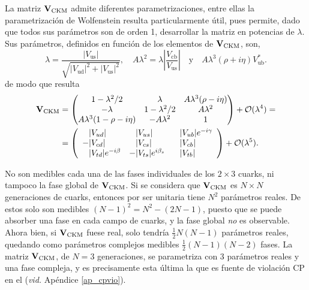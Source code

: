 \color{vero}
La matriz $\mathbf{V}_{\text{CKM}}$ admite diferentes parametrizaciones, entre ellas la parametrización de Wolfenstein resulta particularmente útil, pues permite, dado que todos sus parámetros son de orden 1, desarrollar la matriz en potencias de $\lambda$. Sus parámetros, definidos en función de los elementos de $\mathbf{V}_{\text{CKM}}$, son,
\[ \lambda = \frac{|V_{\text{us}}|}{\sqrt{|V_{\text{ud}}|^2+|V_{\text{us}}|^2}}, \quad A \lambda^2 = \lambda \left|\frac{V_{\text{cb}}}{V_{\text{us}}}\right|\quad \text{y} \quad A \lambda^3 (\rho + i \eta ) V_{\text{ub}}^* . \] \color{norm}
de modo que resulta
\begin{equation}
\begin{split}
\mathbf{V}_{\text{CKM}}   & = \begin{pmatrix} 1-\lambda^2/2 & \lambda & A\lambda^3(\rho-i\eta) \\
 -\lambda & 1-\lambda^2/2 & A\lambda^2 \\
 A\lambda^3(1-\rho-i\eta) & -A\lambda^2 & 1  \end{pmatrix} + \mathcal{O}(\lambda ^4 )= \\ & =
 \left(\begin{array}{lll}
	\phantom{-} |V_{ud}| & \phantom{-}|V_{us}| & \phantom{-}|V_{ub}|e^{-i\gamma} \\
	-|V_{cd}| & \phantom{-}|V_{cs}| & \phantom{-}|V_{cb}| \\
	  \phantom{-}|V_{td}|e^{-i\beta} &-|V_{ts}|e^{i\beta_s} & \phantom{-}|V_{tb}| \\
\end{array}\right) + \mathcal{O}(\lambda ^5 ).
\end{split}	
\end{equation}
\color{vero}


%

No son medibles cada una de las fases individuales de los $2\times3$ cuarks, ni tampoco la fase global de $\mathbf{V}_{\text{CKM}}$. Si se considera que $\mathbf{V}_{\text{CKM}}$ es $N \times N$ generaciones de cuarks, entonces por ser unitaria tiene $N^2$ parámetros reales. 
De estos solo son medibles $(N-1)^2 = N^2 - (2N-1)$, puesto que se puede absorber una fase en cada campo de cuarks, y la fase global \textit{no} es observable. Ahora bien, si $\mathbf{V}_{\text{CKM}}$ fuese real, solo tendría $\frac{1}{2} N(N -1)$ parámetros reales, quedando como parámetros complejos medibles $\frac{1}{2}(N-1)(N-2)$ fases. \color{norm}
%
La matriz $\mathbf{V}_{\text{CKM}}$, de $N=3$ generaciones, se parametriza con 3 parámetros reales y una fase compleja, y es precisamente esta última la que es fuente de violación CP en el \stdmod (\emph{vid.} Apéndice \ref{ap_cpvio}).

